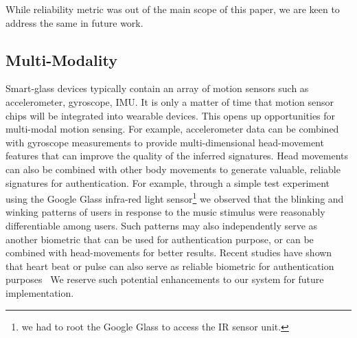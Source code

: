 While reliability metric was out of the main scope of this paper, we are keen
to address the same in future work.

\subsection{Multi-Modality}
Smart-glass devices typically contain an array of motion sensors such as accelerometer, gyroscope, IMU. It is only a matter of time that motion sensor chips will be integrated into wearable devices.
This opens up opportunities for multi-modal motion sensing. For example,
accelerometer data can be combined with gyroscope measurements to provide
multi-dimensional head-movement features that can improve the quality of the
inferred signatures. Head movements can also be combined with other body movements to generate
valuable, reliable signatures for authentication. 
For example, through a simple test experiment using the Google Glass
infra-red light sensor\footnote{we had to root the Google Glass to access the
IR sensor unit.} we observed that the blinking and winking patterns of users in
response to the music stimulus were reasonably differentiable among users.
Such patterns may also independently serve as another biometric that can be
used for authentication purpose, or can be combined with head-movements for better results.
Recent studies have shown that heart beat or pulse can also serve as reliable
biometric for authentication purposes~\cite{hernandezbioglass,nymi}
We reserve such potential enhancements to our system for future implementation.


